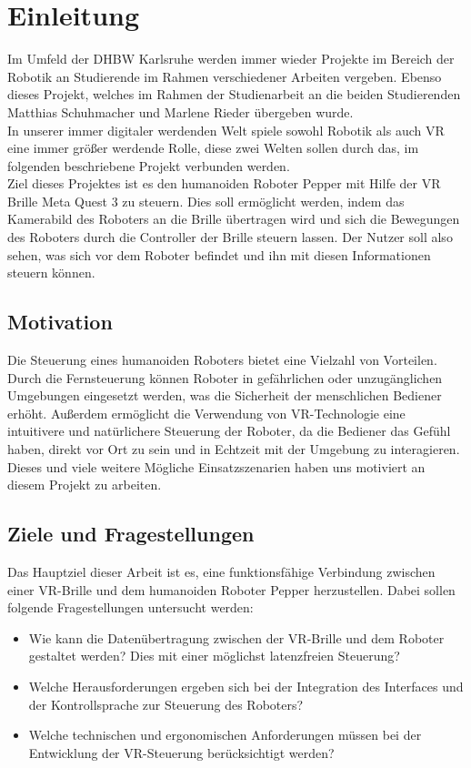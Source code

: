 \chapter{Einleitung}
Im Umfeld der \ac{DHBW} Karlsruhe werden immer wieder Projekte im Bereich der Robotik an Studierende im Rahmen verschiedener Arbeiten vergeben. Ebenso dieses Projekt, welches im Rahmen der Studienarbeit an die beiden Studierenden Matthias Schuhmacher und Marlene Rieder übergeben wurde. 
\\

\noindent 
In unserer immer digitaler werdenden Welt spiele sowohl Robotik als auch \ac{VR} eine immer größer werdende Rolle, diese zwei Welten sollen durch das, im folgenden beschriebene Projekt verbunden werden.
\\

\noindent
Ziel dieses Projektes ist es den humanoiden Roboter Pepper mit Hilfe der \ac{VR} Brille Meta Quest 3 zu steuern. Dies soll ermöglicht werden, indem das Kamerabild des Roboters an die Brille übertragen wird und sich die Bewegungen des Roboters durch die Controller der Brille steuern lassen. Der Nutzer soll also sehen, was sich vor dem Roboter befindet und ihn mit diesen Informationen steuern können.

\section{Motivation}
Die Steuerung eines humanoiden Roboters bietet eine Vielzahl von Vorteilen. Durch die Fernsteuerung können Roboter in gefährlichen oder unzugänglichen Umgebungen eingesetzt werden, was die Sicherheit der menschlichen Bediener erhöht. Außerdem ermöglicht die Verwendung von VR-Technologie eine intuitivere und natürlichere Steuerung der Roboter, da die Bediener das Gefühl haben, direkt vor Ort zu sein und in Echtzeit mit der Umgebung zu interagieren. Dieses und viele weitere Mögliche Einsatzszenarien haben uns motiviert an diesem Projekt zu arbeiten.

\section{Ziele und Fragestellungen}
Das Hauptziel dieser Arbeit ist es, eine funktionsfähige Verbindung zwischen einer VR-Brille und dem humanoiden Roboter Pepper herzustellen. Dabei sollen folgende Fragestellungen untersucht werden:
\begin{itemize}
    \item Wie kann die Datenübertragung zwischen der VR-Brille und dem Roboter gestaltet werden? Dies mit einer möglichst latenzfreien Steuerung?
    \item Welche Herausforderungen ergeben sich bei der Integration des Interfaces und der Kontrollsprache zur Steuerung des Roboters?
    \item Welche technischen und ergonomischen Anforderungen müssen bei der Entwicklung der VR-Steuerung berücksichtigt werden?
\end{itemize}

